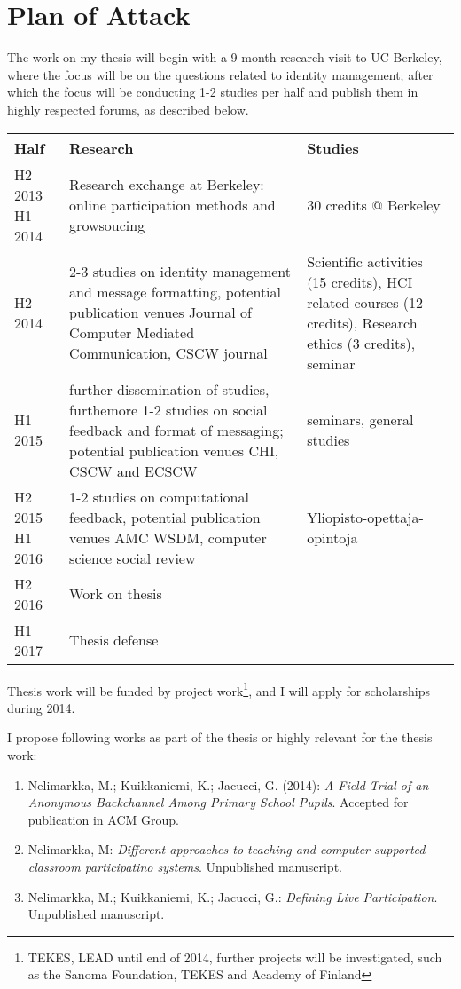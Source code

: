 \documentclass{article}
\begin{document}
\section{Plan of Attack}

The work on my thesis will begin with a 9 month research visit to UC Berkeley, where the focus will be on the questions related to identity management; after which the focus will be conducting 1-2 studies per half and publish them in highly respected forums, as described below.

\begin{table*}[!h]
\begin{tabular}{p{}p{}p{}}
Half & Research & Studies \\ 
\hline 
H2 2013 \newline H1 2014 & Research exchange at Berkeley: online participation methods and growsoucing & 30 credits @ Berkeley \\ 
\hline
H2 2014 & 2-3 studies on identity management and message formatting, potential publication venues Journal of Computer Mediated Communication, CSCW journal & Scientific activities (15 credits), HCI related courses (12 credits), Research ethics (3 credits), seminar \\ 
H1 2015 & further dissemination of studies, furthemore 1-2 studies on social feedback and format of messaging; potential publication venues CHI, CSCW and ECSCW & seminars, general studies  \\ 
\hline
H2 2015 \newline H1 2016 & 1-2 studies on computational feedback, potential publication venues AMC WSDM, computer science social review & Yliopisto-opettaja-opintoja \\ 
\hline
H2 2016 & Work on thesis & \\ 
H1 2017 & Thesis defense & \\ 
\hline 
\end{tabular} 
\end{table*}

Thesis work will be funded by project work\footnote{TEKES, LEAD until end of 2014, further projects will be investigated, such as the Sanoma Foundation, TEKES and Academy of Finland}, and I will apply for scholarships during 2014.

I propose following works as part of the thesis or highly relevant for the thesis work:

\begin{enumerate}
\item Nelimarkka, M.; Kuikkaniemi, K.; Jacucci, G. (2014): \textit{A Field Trial of an Anonymous Backchannel Among Primary School Pupils}. Accepted for publication in ACM Group.
\item Nelimarkka, M: \textit{Different approaches to teaching and computer-supported classroom participatino systems}. Unpublished manuscript.
\item Nelimarkka, M.; Kuikkaniemi, K.; Jacucci, G.: \textit{Defining Live Participation}. Unpublished manuscript.
\end{enumerate}
\end{document}
